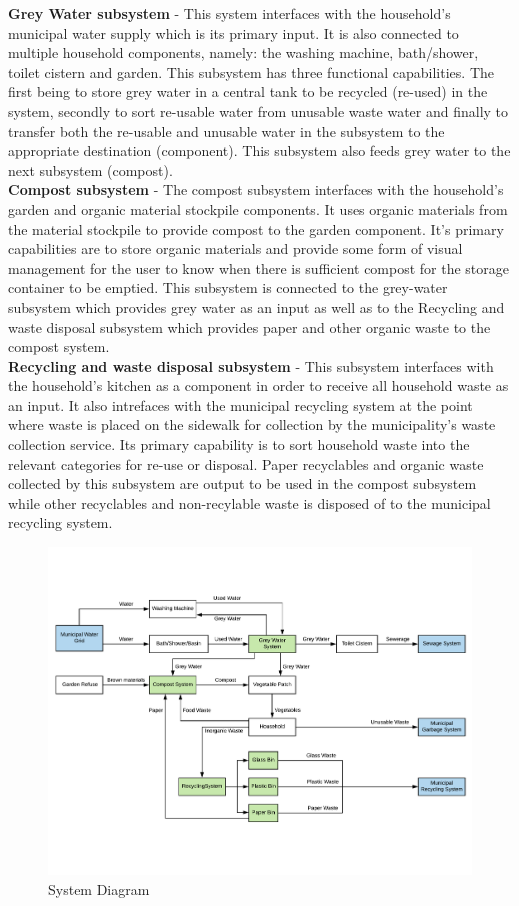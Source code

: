 \documentclass[a4paper,11pt,fleqn]{report}
\begin{document}
\textbf{Grey Water subsystem} - This system interfaces with the household's municipal water supply which is its primary input. It is also connected to multiple household components, namely: the washing machine, bath/shower, toilet cistern and garden. This subsystem has three functional capabilities. The first being to store grey water in a central tank to be recycled (re-used) in the system, secondly to sort re-usable water from unusable waste water and finally to transfer both the re-usable and unusable water in the subsystem to the appropriate destination (component). This subsystem also feeds grey water to the next subsystem (compost).\\

\textbf{Compost subsystem} -  The compost subsystem interfaces with the household's garden and organic material stockpile components. It uses organic materials from the material stockpile to provide compost to the garden component. It's primary capabilities are to store organic materials and provide some form of visual management for the user to know when there is sufficient compost for the storage container to be emptied. This subsystem is connected to the grey-water subsystem which provides grey water as an input as well as to the Recycling and waste disposal subsystem which provides paper and other organic waste to the compost system.\\

\textbf{Recycling and waste disposal subsystem} - This subsystem interfaces with the household's kitchen as a component in order to receive all household waste as an input. It also intrefaces with the municipal recycling system at the point where waste is placed on the sidewalk for collection by the municipality's waste collection service. Its primary capability is to sort household waste into the relevant categories for re-use or disposal. Paper recyclables and organic waste collected by this subsystem are output to be used in the compost subsystem while other recyclables and non-recylable waste is disposed of to the municipal recycling system.
%
\begin{figure}[h!]
\begin{center}
\includegraphics[scale = 0.55]{System_Diagram.pdf}
\caption{System Diagram}
\label{fig: systemDiagram}
\end{center}
\end{figure}
%
\end{document}
